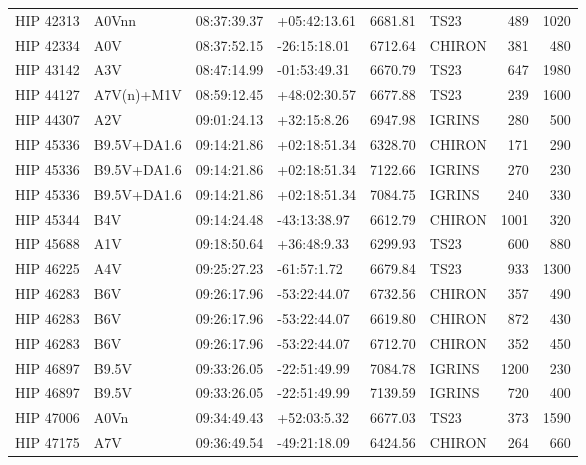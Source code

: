 \documentclass{emulateapj}
\begin{document}
\begin{longtable*}{|l|lllrlrr|}
   HIP 42313 &          A0Vnn &    08:37:39.37 &   +05:42:13.61 &  6681.81 &       TS23 &      489 &    1020 \\
   HIP 42334 &            A0V &    08:37:52.15 &   -26:15:18.01 &  6712.64 &     CHIRON &      381 &     480 \\
   HIP 43142 &            A3V &    08:47:14.99 &   -01:53:49.31 &  6670.79 &       TS23 &      647 &    1980 \\
   HIP 44127 &     A7V(n)+M1V &    08:59:12.45 &   +48:02:30.57 &  6677.88 &       TS23 &      239 &    1600 \\
   HIP 44307 &            A2V &    09:01:24.13 &    +32:15:8.26 &  6947.98 &     IGRINS &      280 &     500 \\
   HIP 45336 &    B9.5V+DA1.6 &    09:14:21.86 &   +02:18:51.34 &  6328.70 &     CHIRON &      171 &     290 \\
   HIP 45336 &    B9.5V+DA1.6 &    09:14:21.86 &   +02:18:51.34 &  7122.66 &     IGRINS &      270 &     230 \\
   HIP 45336 &    B9.5V+DA1.6 &    09:14:21.86 &   +02:18:51.34 &  7084.75 &     IGRINS &      240 &     330 \\
   HIP 45344 &            B4V &    09:14:24.48 &   -43:13:38.97 &  6612.79 &     CHIRON &     1001 &     320 \\
   HIP 45688 &            A1V &    09:18:50.64 &    +36:48:9.33 &  6299.93 &       TS23 &      600 &     880 \\
   HIP 46225 &            A4V &    09:25:27.23 &    -61:57:1.72 &  6679.84 &       TS23 &      933 &    1300 \\
   HIP 46283 &            B6V &    09:26:17.96 &   -53:22:44.07 &  6732.56 &     CHIRON &      357 &     490 \\
   HIP 46283 &            B6V &    09:26:17.96 &   -53:22:44.07 &  6619.80 &     CHIRON &      872 &     430 \\
   HIP 46283 &            B6V &    09:26:17.96 &   -53:22:44.07 &  6712.70 &     CHIRON &      352 &     450 \\
   HIP 46897 &          B9.5V &    09:33:26.05 &   -22:51:49.99 &  7084.78 &     IGRINS &     1200 &     230 \\
   HIP 46897 &          B9.5V &    09:33:26.05 &   -22:51:49.99 &  7139.59 &     IGRINS &      720 &     400 \\
   HIP 47006 &           A0Vn &    09:34:49.43 &    +52:03:5.32 &  6677.03 &       TS23 &      373 &    1590 \\
   HIP 47175 &            A7V &    09:36:49.54 &   -49:21:18.09 &  6424.56 &     CHIRON &      264 &     660 \\

\end{longtable*}
\end{document}
